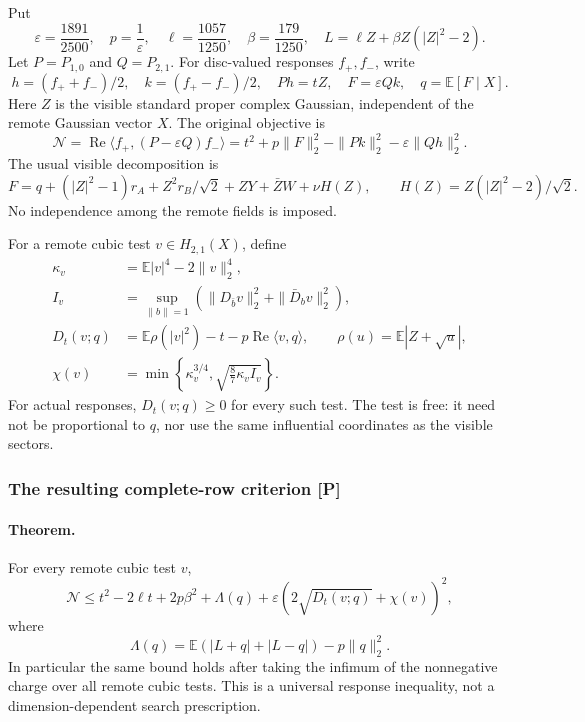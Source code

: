 Put
\[
 \varepsilon=\frac{1891}{2500},\quad p=\frac1\varepsilon,
 \quad \ell=\frac{1057}{1250},\quad\beta=\frac{179}{1250},
 \quad L=\ell Z+\beta Z(|Z|^2-2).
\]
Let $P=P_{1,0}$ and $Q=P_{2,1}$. For disc-valued responses $f_+,f_-$,
write
\[
 h=(f_++f_-)/2,\quad k=(f_+-f_-)/2,\quad Ph=tZ,
 \quad F=\varepsilon Qk,\quad q=\mathbb E[F\mid X].
\]
Here $Z$ is the visible standard proper complex Gaussian, independent of
the remote Gaussian vector $X$. The original objective is
\[
 \mathcal N=\operatorname{Re}\langle f_+,(P-\varepsilon Q)f_-\rangle
 =t^2+p\|F\|_2^2-\|Pk\|_2^2-\varepsilon\|Qh\|_2^2.
\]
The usual visible decomposition is
\[
 F=q+(|Z|^2-1)r_A+Z^2r_B/\sqrt2+ZY+\bar ZW+\nu H(Z),
 \qquad H(Z)=Z(|Z|^2-2)/\sqrt2.
\]
No independence among the remote fields is imposed.

For a remote cubic test $v\in H_{2,1}(X)$, define
\begin{align*}
 \kappa_v&=\mathbb E|v|^4-2\|v\|_2^4,\\
 I_v&=\sup_{\|b\|=1}
   \left(\|D_{\bar b}v\|_2^2+\|\bar D_bv\|_2^2\right),\\
 D_t(v;q)&=\mathbb E\rho(|v|^2)-t-p\operatorname{Re}\langle v,q\rangle,
 \qquad \rho(u)=\mathbb E|Z+\sqrt u|,\\
 \chi(v)&=\min\left\{\kappa_v^{3/4},
                   \sqrt{\frac87\kappa_v I_v}\right\}.
\end{align*}
For actual responses, $D_t(v;q)\ge0$ for every such test.
The test is free: it need not be proportional to $q$, nor use the same
influential coordinates as the visible sectors.

\subsubsection{The resulting complete-row criterion [P]}

\paragraph{Theorem.}
For every remote cubic test $v$,
\begin{equation}\label{eq:cr-main}
 \boxed{\quad
 \mathcal N\le t^2-2\ell t+2p\beta^2+\Lambda(q)
       +\varepsilon\left(2\sqrt{D_t(v;q)}+\chi(v)\right)^2,
 \quad}
\end{equation}
where
\[
 \Lambda(q)=\mathbb E(|L+q|+|L-q|)-p\|q\|_2^2.
\]
In particular the same bound holds after taking the infimum of the
nonnegative charge over all remote cubic tests. This is a universal
response inequality, not a dimension-dependent search prescription.

